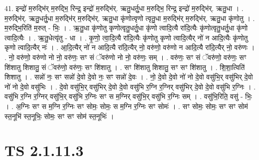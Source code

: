 \documentclass[17pt]{extarticle}
\begin{document}
41. इन्द्रो॑ म॒रुद्भि॑र् म॒रुद्भि॒ रिन्द्र॒ इन्द्रो॑ म॒रुद्भि॑र्. ऋतु॒धर्तु॒धा म॒रुद्भि॒ रिन्द्र॒ इन्द्रो॑ म॒रुद्भि॑र्. ऋतु॒धा । . म॒रुद्भि॑र्. ऋतु॒धर्तु॒धा म॒रुद्भि॑र् म॒रुद्भि॑र्. ऋतु॒धा कृ॑णोत्वृणो त्वृतु॒धा म॒रुद्भि॑र् म॒रुद्भि॑र्. ऋतु॒धा कृ॑णोतु । . म॒रुद्भि॒रिति॑ म॒रुत् - भिः॒ । . ऋ॒तु॒धा कृ॑णोतु कृणोत्वृतु॒धर्तु॒धा कृ॑णो त्वादि॒त्यै रा॑दि॒त्यैः 
कृ॑णोत्वृतु॒धर्तु॒धा कृ॑णो त्वादि॒त्यैः । . ऋ॒तु॒धेत्यृ॑तु - धा । . कृ॒णो॒ त्वा॒दि॒त्यै रा॑दि॒त्यैः कृ॑णोतु कृणो त्वादि॒त्यैर् नो॑ न आदि॒त्यैः कृ॑णोतु कृणो त्वादि॒त्यैर् नः॑ । . आ॒दि॒त्यैर् नो॑ न आदि॒त्यै रा॑दि॒त्यैर् नो॒ वरु॑णो॒ वरु॑णो न आदि॒त्यै रा॑दि॒त्यैर् नो॒ वरु॑णः । . नो॒ वरु॑णो॒ वरु॑णो नो नो॒ वरु॑णः॒ सꣳ सं ॅवरु॑णो नो नो॒ वरु॑णः॒ सम् । . वरु॑णः॒ सꣳ सं ॅवरु॑णो॒ वरु॑णः॒ सꣳ शि॑शातु शिशातु॒ सं ॅवरु॑णो॒ वरु॑णः॒ सꣳ शि॑शातु । . सꣳ शि॑शातु शिशातु॒ सꣳ सꣳ शि॑शातु । . शि॒शा॒त्विति॑ शिशातु । . सन्नो॑ नः॒ सꣳ सन्नो॑ दे॒वो दे॒वो नः॒ सꣳ सन्नो॑ दे॒वः । . नो॒ दे॒वो दे॒वो नो॑ नो दे॒वो वसु॑भि॒र् वसु॑भिर् दे॒वो नो॑ नो दे॒वो वसु॑भिः । . दे॒वो वसु॑भि॒र् वसु॑भिर् दे॒वो दे॒वो वसु॑भि र॒ग्नि र॒ग्निर् वसु॑भिर् दे॒वो दे॒वो वसु॑भि र॒ग्निः । . वसु॑भि र॒ग्नि र॒ग्निर् वसु॑भि॒र् वसु॑भि र॒ग्निः सꣳ स म॒ग्निर् वसु॑भि॒र् वसु॑भि र॒ग्निः सम् । . वसु॑भि॒रिति॒ वसु॑ - भिः॒ । . अ॒ग्निः सꣳ स म॒ग्नि र॒ग्निः सꣳ सोमः॒ सोमः॒ स म॒ग्नि र॒ग्निः सꣳ सोमः॑ । . सꣳ सोमः॒ सोमः॒ सꣳ सꣳ सोम॑ स्त॒नूभि॑ स्त॒नूभिः॒ सोमः॒ सꣳ सꣳ सोम॑ स्त॒नूभिः॑ । \newline
\pagebreak
{}
\section*{ TS 2.1.11.3 }
\end{document}

